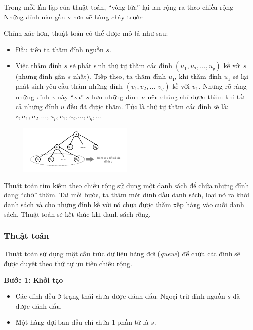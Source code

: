 \documentclass{article}
\begin{document}
Trong mỗi lần lặp của thuật toán, ``vòng lửa'' lại lan rộng ra theo chiều rộng. Những đỉnh nào gần $s$ hơn sẽ bùng cháy trước.

Chính xác hơn, thuật toán có thể được mô tả như sau:
\begin{itemize}
    \item Đầu tiên ta thăm đỉnh nguồn $s$.
    \item Việc thăm đỉnh $s$ sẽ phát sinh thứ tự thăm các đỉnh $(u_1, u_2, \ldots, u_p)$ kề với $s$ (những đỉnh gần $s$ nhất). Tiếp theo, ta thăm đỉnh $u_1$, khi thăm đỉnh $u_1$ sẽ lại phát sinh yêu cầu thăm những đỉnh $(v_1, v_2, \ldots, v_q)$ kề với $u_1$. Nhưng rõ ràng những đỉnh $v$ này ``xa'' $s$ hơn những đỉnh $u$ nên chúng chỉ được thăm khi tất cả những đỉnh $u$ đều đã được thăm. Tức là thứ tự thăm các đỉnh sẽ là: $s, u_1, u_2, \ldots, u_p, v_1, v_2, \ldots, v_q, \ldots$
\end{itemize}

\begin{figure}[h]
    \centering
    \includegraphics[width=0.5\textwidth]{img/b6/breadth-first-search_img2.png}
\end{figure}

Thuật toán tìm kiếm theo chiều rộng sử dụng một danh sách để chứa những đỉnh đang ``chờ'' thăm. Tại mỗi bước, ta thăm một đỉnh đầu danh sách, loại nó ra khỏi danh sách và cho những đỉnh kề với nó chưa được thăm xếp hàng vào cuối danh sách. Thuật toán sẽ kết thúc khi danh sách rỗng.

\subsubsection{Thuật toán}

Thuật toán sử dụng một cấu trúc dữ liệu hàng đợi (\textit{queue}) để chứa các đỉnh sẽ được duyệt theo thứ tự ưu tiên chiều rộng.

\textbf{Bước 1: Khởi tạo}
\begin{itemize}
    \item Các đỉnh đều ở trạng thái chưa được đánh dấu. Ngoại trừ đỉnh nguồn $s$ đã được đánh dấu.
    \item Một hàng đợi ban đầu chỉ chứa 1 phần tử là $s$.
\end{itemize}
\end{document}
